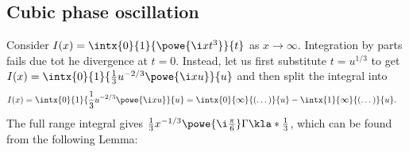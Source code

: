 \documentclass[english, parskip=full]{scrartcl}
\begin{document}
\subsection{Cubic phase oscillation}
Consider $I(x) = \intx{0}{1}{\powe{\i xt^3}}{t}$ as $x\rightarrow\infty$.
%
Integration by parts fails due tot he divergence at $t=0$.
Instead, let us first substitute $t=u^{1/3}$ to get $I(x) = \intx{0}{1}{\frac{1}{3}u^{-2/3} \powe{\i xu}}{u}$ and then split the integral into
\begin{align}
I(x) &= \intx{0}{1}{\frac{1}{3}u^{-2/3} \powe{\i xu}}{u} = \intx{0}{\infty}{(\dots)}{u} - \intx{1}{\infty}{(\dots)}{u}.
\end{align}
The full range integral gives $\frac{1}{3} x^{-1/3} \powe{\i \frac{\pi}{6}} \Gamma\kla*{\frac{1}{3}}$, which can be found from the following Lemma:
\end{document}
